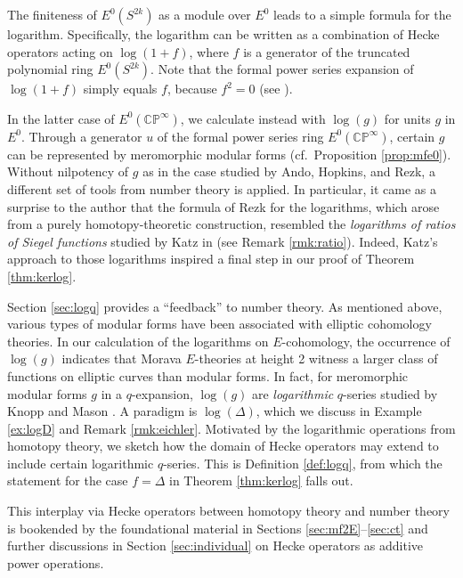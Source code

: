 \documentclass{gtpart}
\theoremstyle{definition}
\theoremstyle{remark}
\newcommand{\mb}[1]{\mathbb{#1}}
\newcommand{\BC}{{\mb C}}
\newcommand{\BP}{{\mb P}}
\renewcommand{\D}{\Delta}
\renewcommand{\=}{\approx}
\renewcommand{\-}{\sim}
\numberwithin{equation}{section}
\begin{document}
The finiteness of $E^0(S^{2 k})$ as a module over $E^0$ leads to a simple 
formula for the logarithm.  Specifically, the logarithm can be written as a 
combination of Hecke operators acting on $\log (1 + f)$, where $f$ is a 
generator of the truncated polynomial ring $E^0(S^{2 k})$.  Note that the formal 
power series expansion of $\log (1 + f)$ simply equals $f$, because $f^2 = 0$ 
(see \cite[Proposition 4.8 and Example 4.9]{koandtmf}).  

In the latter case of $E^0(\BC\BP^\infty)$, we calculate instead with $\log(g)$ 
for units $g$ in $E^0$.  Through a generator $u$ of the formal power series ring 
$E^0(\BC\BP^\infty)$, certain $g$ can be represented by meromorphic modular 
forms (cf.~Proposition \ref{prop:mfe0}).  Without nilpotency of $g$ as in the 
case studied by Ando, Hopkins, and Rezk, a different set of tools from number 
theory is applied.  In particular, it came as a surprise to the author that the 
formula of Rezk for the logarithms, which arose from a purely homotopy-theoretic 
construction, resembled the {\em logarithms of ratios of Siegel functions} 
studied by Katz in \cite[Section 10.1]{padicinterp} (see Remark 
\ref{rmk:ratio}).  Indeed, Katz's approach to those logarithms inspired a final 
step in our proof of Theorem \ref{thm:kerlog}.  

Section \ref{sec:logq} provides a ``feedback'' to number theory.  As mentioned 
above, various types of modular forms have been associated with elliptic 
cohomology theories.  In our calculation of the logarithms on $E$-cohomology, 
the occurrence of $\log(g)$ indicates that Morava $E$-theories at height 2 
witness a larger class of functions on elliptic curves than modular forms.  In 
fact, for meromorphic modular forms $g$ in a $q$-expansion, $\log(g)$ are {\em 
logarithmic} $q$-series studied by Knopp and Mason \cite{KnoppMason}.  A 
paradigm is $\log(\D)$, which we discuss in Example \ref{ex:logD} and Remark 
\ref{rmk:eichler}.  Motivated by the logarithmic operations from homotopy 
theory, we sketch how the domain of Hecke operators may extend to include 
certain logarithmic $q$-series.  This is Definition \ref{def:logq}, from which 
the statement for the case $f = \D$ in Theorem \ref{thm:kerlog} falls out.  

This interplay via Hecke operators between homotopy theory and number theory is 
bookended by the foundational material in Sections \ref{sec:mf2E}--\ref{sec:ct} 
and further discussions in Section \ref{sec:individual} on Hecke operators as 
additive power operations.  
\end{document}
